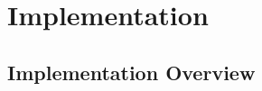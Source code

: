 \chapter{Implementation}
\label{chap:implementation}

\section{Implementation Overview}
\label{sec:implementationOverview}
